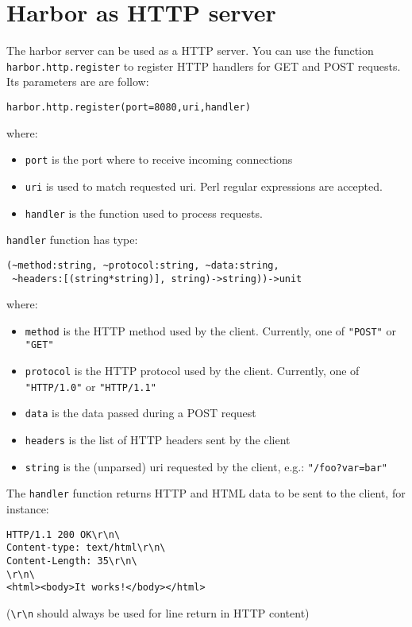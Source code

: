 \section{Harbor as HTTP server}
The harbor server can be used as a HTTP server. You 
can use the function \verb+harbor.http.register+ to register
HTTP handlers for GET and POST requests. Its parameters
are are follow:

\begin{verbatim}
harbor.http.register(port=8080,uri,handler)
\end{verbatim}
 where:

\begin{itemize}
\item \verb+port+ is the port where to receive incoming connections
\item \verb+uri+ is used to match requested uri. Perl regular expressions are accepted.
\item \verb+handler+ is the function used to process requests.

\end{itemize}
\verb+handler+ function has type:

\begin{verbatim}
(~method:string, ~protocol:string, ~data:string, 
 ~headers:[(string*string)], string)->string))->unit
\end{verbatim}
where:

\begin{itemize}
\item \verb+method+ is the HTTP method used by the client. Currently, one of \verb+"POST"+ or \verb+"GET"+
\item \verb+protocol+ is the HTTP protocol used by the client. Currently, one of \verb+"HTTP/1.0"+ or \verb+"HTTP/1.1"+
\item \verb+data+ is the data passed during a POST request
\item \verb+headers+ is the list of HTTP headers sent by the client
\item \verb+string+ is the (unparsed) uri requested by the client, e.g.: \verb+"/foo?var=bar"+

\end{itemize}
The \verb+handler+ function returns HTTP and HTML data to be sent to the client,
for instance:

\begin{verbatim}
HTTP/1.1 200 OK\r\n\
Content-type: text/html\r\n\
Content-Length: 35\r\n\
\r\n\
<html><body>It works!</body></html>
\end{verbatim}
(\verb+\r\n+ should always be used for line return
in HTTP content)

